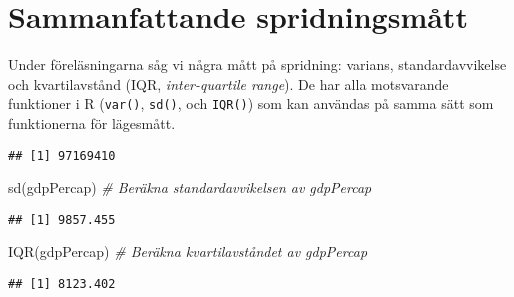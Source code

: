 \documentclass[
]{book}
\newenvironment{Shaded}{\begin{snugshade}}{\end{snugshade}}
\newcommand{\CommentTok}[1]{\textcolor[rgb]{0.56,0.35,0.01}{\textit{#1}}}
\newcommand{\FunctionTok}[1]{\textcolor[rgb]{0.00,0.00,0.00}{#1}}
\newcommand{\NormalTok}[1]{#1}
\newcommand{\OtherTok}[1]{\textcolor[rgb]{0.56,0.35,0.01}{#1}}
\newcommand{\SpecialCharTok}[1]{\textcolor[rgb]{0.00,0.00,0.00}{#1}}
\theoremstyle{definition}
\theoremstyle{definition}
\theoremstyle{definition}
\theoremstyle{definition}
\theoremstyle{remark}
\begin{document}
\hypertarget{sammanfattande-spridningsmuxe5tt}{%
\section{Sammanfattande spridningsmått}\label{sammanfattande-spridningsmuxe5tt}}

Under föreläsningarna såg vi några mått på spridning: varians, standardavvikelse och kvartilavstånd (IQR, \emph{inter-quartile range}). De har alla motsvarande funktioner i R (\texttt{var()}, \texttt{sd()}, och \texttt{IQR()}) som kan användas på samma sätt som funktionerna för lägesmått.

\begin{Shaded}
\end{Shaded}

\begin{verbatim}
## [1] 97169410
\end{verbatim}

\begin{Shaded}
\begin{Highlighting}[]
\FunctionTok{sd}\NormalTok{(gdpPercap)                                    }\CommentTok{\# Beräkna standardavvikelsen av gdpPercap}
\end{Highlighting}
\end{Shaded}

\begin{verbatim}
## [1] 9857.455
\end{verbatim}

\begin{Shaded}
\begin{Highlighting}[]
\FunctionTok{IQR}\NormalTok{(gdpPercap)                                   }\CommentTok{\# Beräkna kvartilavståndet av gdpPercap}
\end{Highlighting}
\end{Shaded}

\begin{verbatim}
## [1] 8123.402
\end{verbatim}
\end{document}

